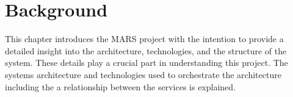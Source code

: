 \newpage
\chapter{Background}
	
This chapter introduces the MARS project with the intention to provide a detailed insight
into the architecture, technologies, and the structure of the system. These details play a crucial part in understanding this project. 
The systems architecture and technologies used to orchestrate the architecture including the 
a relationship between the services is explained.

	
	
	
	